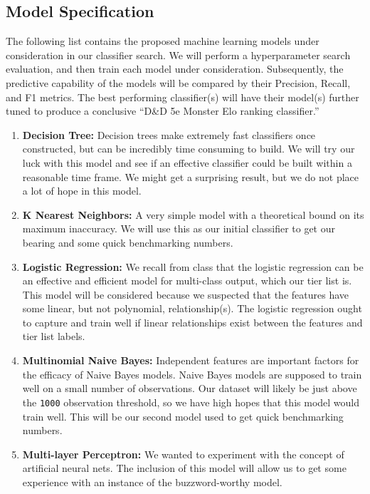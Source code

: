 \documentclass{article}
\newcommand{\DnD}{D\&D 5e\xspace}
\begin{document}
\hypertarget{model-specification}{%
\subsection{Model Specification}\label{model-specification}}
The following list contains the proposed machine learning models under consideration in our classifier search.
We will perform a hyperparameter search evaluation, and then train each model under consideration.
Subsequently, the predictive capability of the models will be compared by their Precision, Recall, and F1 metrics.
The best performing classifier(s) will have their model(s) further tuned to produce a conclusive ``\DnD Monster Elo ranking classifier.''

\begin{enumerate}
	\def\labelenumi{\arabic{enumi}.}
	\item
	\textbf{Decision Tree:} Decision trees make extremely fast classifiers once constructed, but can be incredibly time consuming to build.
	We will try our luck with this model and see if an effective classifier could be built within a reasonable time frame.
	We might get a surprising result, but we do not place a lot of hope in this model.
	\item
	\textbf{K Nearest Neighbors:} A very simple model with a theoretical bound on its maximum inaccuracy.
	We will use this as our initial classifier to get our bearing and some quick benchmarking numbers.
	\item
	\textbf{Logistic Regression:} We recall from class that the logistic regression
	can be an effective and efficient model for multi-class output, which
	our tier list is.
	This model will be considered because we suspected that the features have some linear, but not polynomial, relationship(s).
	The	logistic regression ought to capture and train well if linear relationships exist between the features and tier list labels.
	\item
	\textbf{Multinomial Naive Bayes:} Independent features are important factors for the efficacy of Naive Bayes models.
	Naive Bayes models are supposed to train well on a small number of observations.
	Our dataset will likely be just above the \texttt{1000} observation threshold, so we have high hopes that this model would train well.
	This will be our second model used to get quick benchmarking numbers.
	\item
	\textbf{Multi-layer Perceptron:} We wanted to experiment with the
	concept of artificial neural nets.
	The inclusion of this model will allow us to get some experience with an instance of the buzzword-worthy model.

\end{enumerate}
\end{document}
